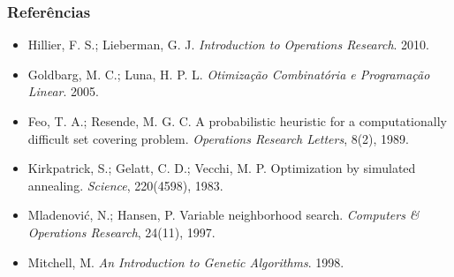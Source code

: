 \documentclass[fleqn]{beamer}
\begin{document}
\begin{frame}
	\frametitle{Referências}
	\begin{itemize}
		\item Hillier, F. S.; Lieberman, G. J. \textit{Introduction to
			Operations Research}. 2010.
		\item Goldbarg, M. C.; Luna, H. P. L. \textit{Otimização
			Combinatória e Programação Linear}. 2005.
		\item Feo, T. A.; Resende, M. G. C. A probabilistic heuristic for
			a computationally difficult set covering problem.
			\textit{Operations Research Letters}, 8(2), 1989.
		\item Kirkpatrick, S.; Gelatt, C. D.; Vecchi, M. P. Optimization
			by simulated annealing. \textit{Science}, 220(4598), 1983.
		\item Mladenovi\'c, N.; Hansen, P. Variable neighborhood search.
			\textit{Computers \& Operations Research}, 24(11), 1997.
		\item Mitchell, M. \textit{An Introduction to Genetic
			Algorithms}. 1998.
	\end{itemize}
\end{frame}
\end{document}
